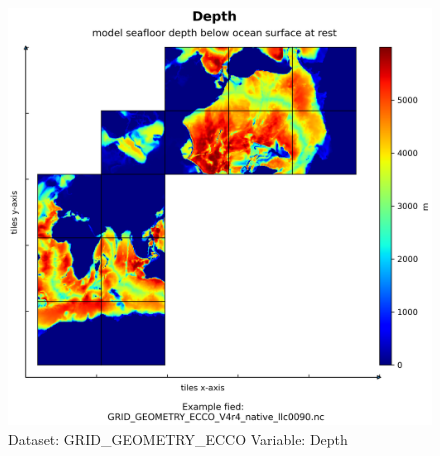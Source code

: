 \begin{figure}[H]
\centering
\includegraphics[scale=0.55]{../images/plots/native_plots_coords/Geometry_Parameters_for_the_Lat-Lon-Cap_90_(llc90)_Native_Model_Grid_(Version_4_Release_4)/Depth.png}
\caption{Dataset: GRID\_GEOMETRY\_ECCO Variable: Depth}
\label{tab:table-GRID_GEOMETRY_ECCO_Depth-Plot}
\end{figure}
\pagebreak
